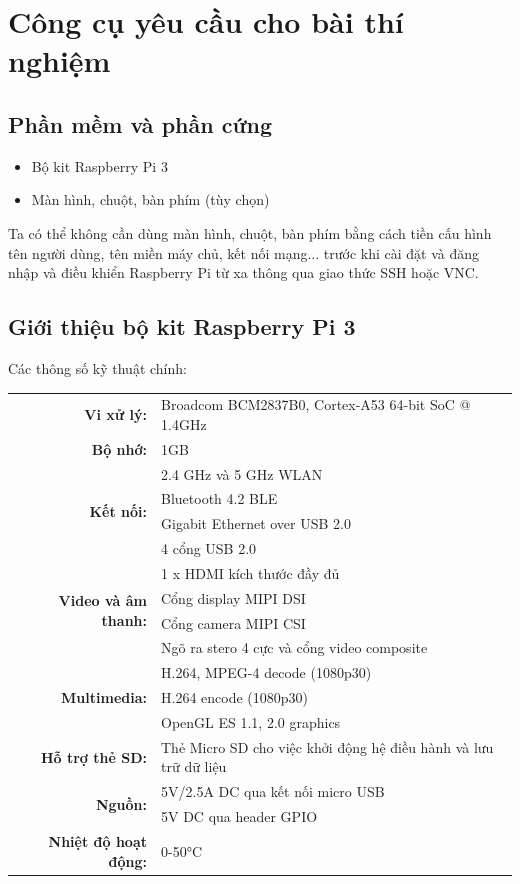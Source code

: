 \section{Công cụ yêu cầu cho bài thí nghiệm}

\subsection{Phần mềm và phần cứng}

\begin{itemize}
    \item Bộ kit Raspberry Pi 3
    \item Màn hình, chuột, bàn phím (tùy chọn)
\end{itemize}

Ta có thể không cần dùng màn hình, chuột, bàn phím 
bằng cách tiền cấu hình tên người dùng, tên miền máy chủ, kết nối mạng... trước khi cài đặt 
và đăng nhập và điều khiển Raspberry Pi từ xa thông qua giao thức SSH hoặc VNC.

\subsection{Giới thiệu bộ kit Raspberry Pi 3}

Các thông số kỹ thuật chính:

{ \centering
\begin{longtable}{rl}
\textbf{Vi xử lý:} & Broadcom BCM2837B0, Cortex-A53 64-bit SoC @ 1.4GHz \\
\textbf{Bộ nhớ:} & 1GB \\
\multirow{4}{*}{\textbf{Kết nối:}} & 2.4 GHz và 5 GHz WLAN \\
 & Bluetooth 4.2 BLE \\
 & Gigabit Ethernet over USB 2.0 \\
 & 4 cổng USB 2.0 \\
\multirow{4}{*}{\textbf{Video và âm thanh:}} & 1 x HDMI kích thước đầy đủ \\
 & Cổng display MIPI DSI \\
 & Cổng camera MIPI CSI \\
 & Ngõ ra stero 4 cực và cổng video composite \\
\multirow{3}{*}{\textbf{Multimedia:}} & H.264, MPEG-4 decode (1080p30) \\
 & H.264 encode (1080p30) \\
 & OpenGL ES 1.1, 2.0 graphics \\
\textbf{Hỗ trợ thẻ SD:} & Thẻ Micro SD cho việc khởi động hệ điều hành và lưu trữ dữ liệu \\
\multirow{2}{*}{\textbf{Nguồn:}} & 5V/2.5A DC qua kết nối micro USB \\
 & 5V DC qua header GPIO \\
\textbf{Nhiệt độ hoạt động:} & 0-50°C
\end{longtable}
}

